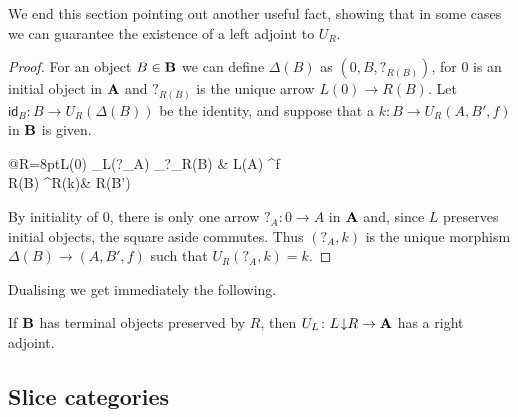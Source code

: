 \documentclass[3p]{elsarticle}
\def\B{\textbf {\textup{B}}}
\def\A{\textbf {\textup{A}}}
\renewcommand{\comma}[2]{#1\hspace{1pt} {\downarrow}#2}
\newcommand{\id}[1]{\mathsf{id}_{#1}}
\theoremstyle{remark}
\theoremstyle{definition}
\begin{document}
We end this section pointing out another useful fact,  showing that in some cases we can guarantee  the existence of a left adjoint to $U_R$. 

\begin{proof} For an object $B\in \B$ we can define $\Delta(B)$ as $(0, B, ?_{R(B)})$, for $0$ is an initial object in $\A$ and $?_{R(B)}$ is the unique arrow $L(0)\to R(B)$. Let $\id{B}\colon B\to U_R(\Delta(B))$ be the identity, and suppose that a $k\colon B\to U_R(A, B', f)$ in $\B$ is given.
	
	\noindent
\begin{minipage}[l]{.2\linewidth}
	\xymatrix@C=30pt@R=8pt{L(0) \ar[r]_{L(?_A)} \ar[d]_{?_{R(B)}} & L(A) \ar[d]^{f}\\ R(B) \ar[r]^{R(k)}& R(B')}
\end{minipage}  \hfill 
	\begin{minipage}[r]{.75\linewidth}
		By initiality of $0$, there is only one arrow $?_A\colon 0\to A $ in $\A$ and, 
		since $L$ preserves initial objects, the square aside commutes. Thus $(?_A,k)$ is the unique morphism $\Delta(B)\to (A, B', f)$ such that $U_R(?_A,k)=k$. \qedhere 
	\end{minipage}

\end{proof}
Dualising we get immediately the following.
\begin{cor}If $\B$ has terminal objects preserved by $R$, then $U_L\colon \comma{L}{R}\to \A$ has a right adjoint.
\end{cor}

\subsection{Slice categories}
\end{document}
